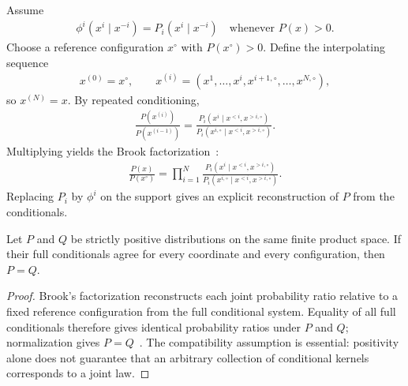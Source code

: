 \documentclass[runningheads]{llncs}
\def\EQSP{3pt}
\newcommand{\cgather}[2][\EQSP]{\begingroup\setlength\abovedisplayskip{#1}\setlength\belowdisplayskip{#1}\begin{gather} #2 \end{gather}\endgroup\noindent}
\begin{document}
Assume
\cgather{
    \phi^i(x^i\mid x^{-i}) = P_i(x^i\mid x^{-i})
    \quad \text{whenever } P(x)>0.
}
Choose a reference configuration $x^\circ$ with $P(x^\circ)>0$.
Define the interpolating sequence
\cgather{
    x^{(0)} = x^\circ, \qquad
    x^{(i)} =
    (x^1,\dots,x^i, x^{i+1,\circ},\dots,x^{N,\circ}),
}
so $x^{(N)} = x$.
By repeated conditioning,
\cgather{
    \frac{P(x^{(i)})}{P(x^{(i-1)})}
    =
    \frac{P_i(x^i\mid x^{<i}, x^{>i,\circ})}
         {P_i(x^{i,\circ}\mid x^{<i}, x^{>i,\circ})}.
}
Multiplying yields the Brook factorization~\cite{brook1964}:
\cgather{
    \frac{P(x)}{P(x^\circ)}
    =
    \prod_{i=1}^N
    \frac{P_i(x^i\mid x^{<i}, x^{>i,\circ})}
         {P_i(x^{i,\circ}\mid x^{<i}, x^{>i,\circ})}.
}
Replacing $P_i$ by $\phi^i$ on the support gives an explicit
reconstruction of $P$ from the conditionals.

\begin{theorem}
\label{thm:brook}
Let $P$ and $Q$ be strictly positive distributions on the same finite product
space. If their full conditionals agree for every coordinate and every
configuration, then $P=Q$.
\end{theorem}

\begin{proof}
Brook's factorization reconstructs each joint probability ratio relative to a
fixed reference configuration from the full conditional system. Equality of
all full conditionals therefore gives identical probability ratios under $P$
and $Q$; normalization gives $P=Q$~\cite{brook1964,dobrushin1968}. The
compatibility assumption is essential: positivity alone does not guarantee that
an arbitrary collection of conditional kernels corresponds to a joint law.
\end{proof}
\end{document}
